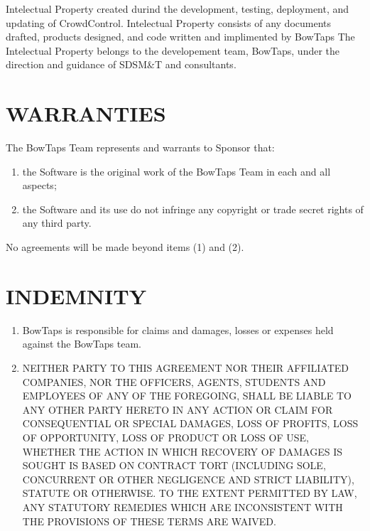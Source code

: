 \documentclass[11pt]{article}
\begin{document}
Intelectual Property created durind the development, testing, deployment, and updating of CrowdControl. Intelectual Property consists of any documents drafted, products designed, and code written and implimented by BowTaps The Intelectual Property belongs to the developement team, BowTaps, under the direction and guidance of SDSM\&T and consultants.

\section{WARRANTIES }  

The BowTaps Team represents and warrants to Sponsor that:         
\begin{enumerate}  \itemsep4pt \parskip0pt 
\item  the Software is the original work of the BowTaps Team in each and all aspects;        

\item the Software and its use do not infringe any copyright or   trade secret rights of any third party.  
\end{enumerate}
No agreements will be made beyond items (1) and (2).

\section{INDEMNITY}   
\begin{enumerate}  \itemsep4pt \parskip0pt 
\item BowTaps is responsible for claims and damages, losses or expenses held against the BowTaps team. 


\item  NEITHER PARTY TO THIS AGREEMENT NOR THEIR AFFILIATED COMPANIES,       NOR THE OFFICERS, AGENTS, STUDENTS AND EMPLOYEES OF ANY OF THE       FOREGOING, SHALL BE LIABLE TO ANY OTHER PARTY HERETO IN ANY ACTION       OR CLAIM FOR CONSEQUENTIAL OR SPECIAL DAMAGES, LOSS OF PROFITS,       LOSS OF OPPORTUNITY, LOSS OF PRODUCT OR LOSS OF USE, WHETHER THE       ACTION IN WHICH RECOVERY OF DAMAGES IS SOUGHT IS BASED ON CONTRACT       TORT (INCLUDING SOLE, CONCURRENT OR OTHER NEGLIGENCE AND STRICT       LIABILITY), STATUTE OR OTHERWISE. TO THE EXTENT PERMITTED BY LAW,       ANY STATUTORY REMEDIES WHICH ARE INCONSISTENT WITH THE PROVISIONS       OF THESE TERMS ARE WAIVED.  
\end{enumerate}
\end{document}
